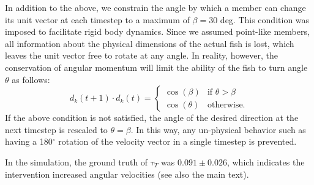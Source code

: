 In addition to the above, we constrain the angle by which a member can change its unit vector at each timestep to a maximum of $\beta = 30$ deg. This condition was imposed to facilitate rigid body dynamics. Since we assumed point-like members, all information about the physical dimensions of the actual fish is lost, which leaves the unit vector free to rotate at any angle. In reality, however, the conservation of angular momentum will limit the ability of the fish to turn angle $\theta$ as follows:
\begin{equation} 
\label{eq:boid3}
  d_k\left(t+1 \right)\cdot d_k(t) = 
  \begin{cases}
   \cos(\beta ) & \text{if $\theta >\beta$} \\
   \cos\left(\theta \right) & \text{otherwise}.
  \end{cases}
\end{equation} 
If the above condition is not satisfied, the angle of the desired direction at the next timestep is rescaled to $\theta = \beta$. In this way, any un-physical behavior such as having a 180$^\circ$ rotation of the velocity vector in a single timestep is prevented.

In the simulation, the ground truth of $\tau_T$ was $0.091 \pm 0.026$, which indicates the intervention increased angular velocities (see also the main text). 



